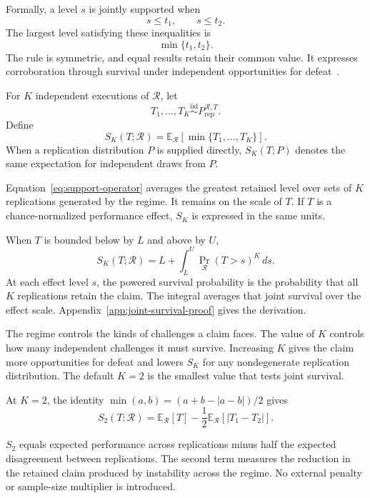\documentclass[11pt]{article}
\newcommand{\Regime}{\mathcal{R}}
\newcommand{\E}{\mathbb{E}}
\newcommand{\iid}{\mathrel{\overset{\mathrm{iid}}{\sim}}}
\theoremstyle{remark}
\begin{document}
Formally, a level $s$ is jointly supported when
\[
s\leq t_1,
\qquad
s\leq t_2.
\]
The largest level satisfying these inequalities is
\[
\min\{t_1,t_2\}.
\]
The rule is symmetric, and equal results retain their common value. It expresses corroboration through survival under independent opportunities for defeat~\cite{popper1959logic}.

For $K$ independent executions of $\Regime$, let
\[
T_1,\ldots,T_K
\iid
P_{\mathrm{rep}}^{\Regime,T}.
\]
Define
\begin{equation}
S_K(T;\Regime)
=
\E_{\Regime}[\min\{T_1,\ldots,T_K\}].
\label{eq:support-operator}
\end{equation}
When a replication distribution $P$ is supplied directly, $S_K(T;P)$ denotes the same expectation for independent draws from $P$.

Equation~\eqref{eq:support-operator} averages the greatest retained level over sets of $K$ replications generated by the regime. It remains on the scale of $T$. If $T$ is a chance-normalized performance effect, $S_K$ is expressed in the same units.

When $T$ is bounded below by $L$ and above by $U$,
\begin{equation}
S_K(T;\Regime)
=
L+\int_L^U \Pr_{\Regime}(T>s)^K\,ds .
\label{eq:joint-survival}
\end{equation}
At each effect level $s$, the powered survival probability is the probability that all $K$ replications retain the claim. The integral averages that joint survival over the effect scale. Appendix~\ref{app:joint-survival-proof} gives the derivation.

The regime controls the kinds of challenges a claim faces. The value of $K$ controls how many independent challenges it must survive. Increasing $K$ gives the claim more opportunities for defeat and lowers $S_K$ for any nondegenerate replication distribution. The default $K=2$ is the smallest value that tests joint survival.

At $K=2$, the identity $\min(a,b)=(a+b-|a-b|)/2$ gives
\begin{equation}
S_2(T;\Regime)
=
\E_{\Regime}[T]
-
\frac12\E_{\Regime}[|T_1-T_2|].
\label{eq:general-decomposition}
\end{equation}

$S_2$ equals expected performance across replications minus half the expected disagreement between replications. The second term measures the reduction in the retained claim produced by instability across the regime. No external penalty or sample-size multiplier is introduced.
\end{document}
